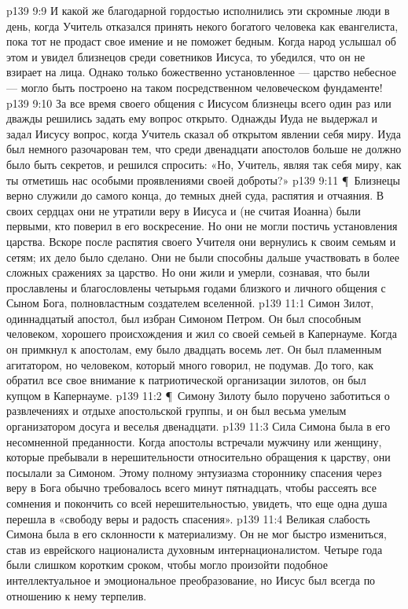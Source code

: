 \vs p139 9:9 И какой же благодарной гордостью исполнились эти скромные люди в день, когда Учитель отказался принять некого богатого человека как евангелиста, пока тот не продаст свое имение и не поможет бедным. Когда народ услышал об этом и увидел близнецов среди советников Иисуса, то убедился, что он не взирает на лица. Однако только божественно установленное --- царство небесное --- могло быть построено на таком посредственном человеческом фундаменте!
\vs p139 9:10 За все время своего общения с Иисусом близнецы всего один раз или дважды решились задать ему вопрос открыто. Однажды Иуда не выдержал и задал Иисусу вопрос, когда Учитель сказал об открытом явлении себя миру. Иуда был немного разочарован тем, что среди двенадцати апостолов больше не должно было быть секретов, и решился спросить: «Но, Учитель, являя так себя миру, как ты отметишь нас особыми проявлениями своей доброты?»
\vs p139 9:11 \P\ Близнецы верно служили до самого конца, до темных дней суда, распятия и отчаяния. В своих сердцах они не утратили веру в Иисуса и (не считая Иоанна) были первыми, кто поверил в его воскресение. Но они не могли постичь установления царства. Вскоре после распятия своего Учителя они вернулись к своим семьям и сетям; их дело было сделано. Они не были способны дальше участвовать в более сложных сражениях за царство. Но они жили и умерли, сознавая, что были прославлены и благословлены четырьмя годами близкого и личного общения с Сыном Бога, полновластным создателем вселенной.
\vs p139 11:1 Симон Зилот, одиннадцатый апостол, был избран Симоном Петром. Он был способным человеком, хорошего происхождения и жил со своей семьей в Капернауме. Когда он примкнул к апостолам, ему было двадцать восемь лет. Он был пламенным агитатором, но человеком, который много говорил, не подумав. До того, как обратил все свое внимание к патриотической организации зилотов, он был купцом в Капернауме.
\vs p139 11:2 \P\ Симону Зилоту было поручено заботиться о развлечениях и отдыхе апостольской группы, и он был весьма умелым организатором досуга и веселья двенадцати.
\vs p139 11:3 Сила Симона была в его несомненной преданности. Когда апостолы встречали мужчину или женщину, которые пребывали в нерешительности относительно обращения к царству, они посылали за Симоном. Этому полному энтузиазма стороннику спасения через веру в Бога обычно требовалось всего минут пятнадцать, чтобы рассеять все сомнения и покончить со всей нерешительностью, увидеть, что еще одна душа перешла в «свободу веры и радость спасения».
\vs p139 11:4 Великая слабость Симона была в его склонности к материализму. Он не мог быстро измениться, став из еврейского националиста духовным интернационалистом. Четыре года были слишком коротким сроком, чтобы могло произойти подобное интеллектуальное и эмоциональное преобразование, но Иисус был всегда по отношению к нему терпелив.

